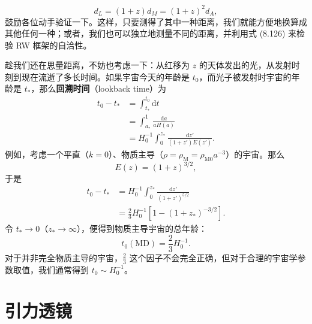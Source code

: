 
\begin{equation*}
d_L = (1+z)d_M = (1+z)^{2}d_A,
\tag{8.126}
\end{equation*}
鼓励各位动手验证一下。这样，只要测得了其中一种距离，我们就能方便地换算成其他任何一种；或者，我们也可以独立地测量不同的距离，并利用式 (8.126) 来检验 RW 框架的自洽性。

趁我们还在思量距离，不妨也考虑一下：从红移为 $z$ 的天体发出的光，从发射时刻到现在流逝了多长时间。如果宇宙今天的年龄是 $t_0$，而光子被发射时宇宙的年龄是 $t_{*}$，那么\textbf{回溯时间}（lookback time）为
\begin{align*}
t_0 - t_{*} &= \int_{t_{*}}^{t_0}\mathrm{d}t\\
&= \int_{a_{*}}^{1}\frac{\mathrm{d}a}{aH(a)}\\
&= H_0^{-1}\int_0^{z_{*}}\frac{\mathrm{d}z'}{(1+z')E(z')}.
\tag{8.127}
\end{align*}
例如，考虑一个平直（$k=0$）、物质主导（$\rho=\rho_{\mathrm{M}}=\rho_{\mathrm{M}0}a^{-3}$）的宇宙。那么
\begin{equation*}
E(z) = (1+z)^{3/2},
\tag{8.128}
\end{equation*}
于是
\begin{align*}
t_0 - t_{*} &= H_0^{-1}\int_0^{z_{*}}\frac{\mathrm{d}z'}{(1+z')^{5/2}}\\
&= \frac{2}{3}H_0^{-1}\left[1-(1+z_{*})^{-3/2}\right].
\tag{8.129}
\end{align*}
令 $t_{*}\to 0$（$z_{*}\to\infty$），便得到物质主导宇宙的总年龄：
\begin{equation*}
t_0(\mathrm{MD}) = \frac{2}{3}H_0^{-1}.
\tag{8.130}
\end{equation*}
对于并非完全物质主导的宇宙，$\frac{2}{3}$ 这个因子不会完全正确，但对于合理的宇宙学参数取值，我们通常得到 $t_0\sim H_0^{-1}$。

\section{引力透镜}

